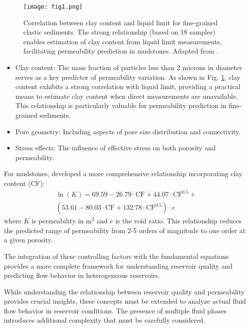 \documentclass[journal]{IEEEtran}
\begin{document}
\begin{figure}[t]
    \centering
    \texttt{[image: fig1.png]}
    \caption{Correlation between clay content and liquid limit for fine-grained clastic sediments. The strong relationship (based on 18 samples) enables estimation of clay content from liquid limit measurements, facilitating permeability prediction in mudstones. Adapted from \textcite{yang_permeabilityporosity_2010}.}
    \label{fig:clay_liquid}
\end{figure}
\begin{itemize}
    \item Clay content: The mass fraction of particles less than 2 microns in diameter serves as a key predictor of permeability variation. As shown in Fig. \ref{fig:clay_liquid}, clay content exhibits a strong correlation with liquid limit, providing a practical means to estimate clay content when direct measurements are unavailable. This relationship is particularly valuable for permeability prediction in fine-grained sediments.
    \item Pore geometry: Including aspects of pore size distribution and connectivity.
    \item Stress effects: The influence of effective stress on both porosity and permeability.
\end{itemize}
For mudstones, \textcite{yang_permeabilityporosity_2010} developed a more comprehensive relationship incorporating clay content (CF):
\begin{align}
\ln(K) = 69.59 - 26.79\cdot\text{CF} + 44.07\cdot\text{CF}^{0.5} + \nonumber\\
(53.61 - 80.03\cdot\text{CF} + 132.78\cdot\text{CF}^{0.5})\cdot e
\end{align}
\noindent where $K$ is permeability in m$^2$ and $e$ is the void ratio. This relationship reduces the predicted range of permeability from 2-5 orders of magnitude to one order at a given porosity.

The integration of these controlling factors with the fundamental equations provides a more complete framework for understanding reservoir quality and predicting flow behavior in heterogeneous reservoirs.

While understanding the relationship between reservoir quality and permeability provides crucial insights, these concepts must be extended to analyze actual fluid flow behavior in reservoir conditions. The presence of multiple fluid phases introduces additional complexity that must be carefully considered.
\end{document}
